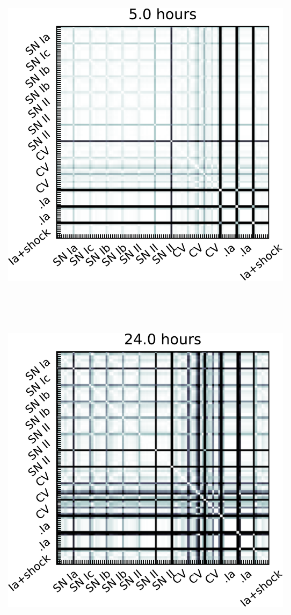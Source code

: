 \begin{figure}[hbt]
    \begin{subfigure}[t]{0.45\textwidth}
        \centering
        \includegraphics[width=0.8\textwidth]{figs/transients/TransientsAgeSimilarity3.pdf}
    \end{subfigure}%
    ~ 
    \begin{subfigure}[t]{0.45\textwidth}
        \centering
        \includegraphics[width=0.8\textwidth]{figs/transients/TransientsAgeSimilarity4.pdf}
    \end{subfigure}
    
  

\end{figure}

